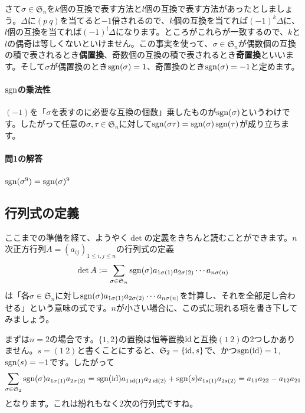 さて$\sigma \in \mathfrak{S}_n$を$k$個の互換で表す方法と$l$個の互換で表す方法があったとしましょう。$\Delta$に$(p\ q)$を当てると$-1$倍されるので、$k$個の互換を当てれば$(-1)^k\Delta$に、$l$個の互換を当てれば$(-1)^l\Delta$になります。ところがこれらが一致するので、$k$と$l$の偶奇は等しくないといけません。この事実を使って、$\sigma \in \mathfrak{S}_n$が偶数個の互換の積で表されるとき\textbf{偶置換}、奇数個の互換の積で表されるとき\textbf{奇置換}といいます。そして$\sigma$が偶置換のとき$\operatorname{sgn}(\sigma) = 1$、奇置換のとき$\operatorname{sgn}(\sigma) = -1$と定めます。

\paragraph{$\operatorname{sgn}$の乗法性}

$(-1)$を「$\sigma$を表すのに必要な互換の個数」乗したものが$\operatorname{sgn}(\sigma)$というわけです。したがって任意の$\sigma, \tau \in \mathfrak{S}_n$に対して$\operatorname{sgn}(\sigma\tau) = \operatorname{sgn}(\sigma)\operatorname{sgn}(\tau)$が成り立ちます。

\paragraph{問1の解答}

$\operatorname{sgn}(\sigma^9) = \operatorname{sgn}(\sigma)^9$

\subsection{行列式の定義}
ここまでの準備を経て、ようやく$\det$の定義をきちんと読むことができます。$n$次正方行列$A = (a_{ij})_{1 \leq i,j \leq n}$の行列式の定義
\[
\det A := \sum_{\sigma \in \mathfrak{S}_n} \operatorname{sgn}(\sigma) a_{1 \sigma(1)} a_{2 \sigma(2)} \cdots a_{n \sigma(n)}
\]
は「各$\sigma \in \mathfrak{S}_n$に対し$\operatorname{sgn}(\sigma) a_{1 \sigma(1)} a_{2 \sigma(2)} \cdots a_{n \sigma(n)}$を計算し、それを全部足し合わせる」という意味の式です。$n$が小さい場合に、この式に現れる項を書き下してみましょう。

まずは$n = 2$の場合です。$\{1, 2\}$の置換は恒等置換$\operatorname{id}$と互換$(1\ 2)$の$2$つしかありません。$s = (1 \ 2)$と書くことにすると、$\mathfrak{S}_2 = \{\operatorname{id}, s\}$で、かつ$\operatorname{sgn}(\operatorname{id}) = 1$, $\operatorname{sgn}(s) = -1$です。したがって
\[
\sum_{\sigma \in \mathfrak{S}_2} \operatorname{sgn}(\sigma) a_{1 \sigma(1)} a_{2 \sigma(2)}
= \operatorname{sgn}(\operatorname{id}) a_{1 \operatorname{id}(1)} a_{2 \operatorname{id}(2)} + \operatorname{sgn}(s) a_{1 s(1)} a_{2 s(2)} = a_{11} a_{22} - a_{12} a_{21}
\]
となります。これは紛れもなく$2$次の行列式ですね。

